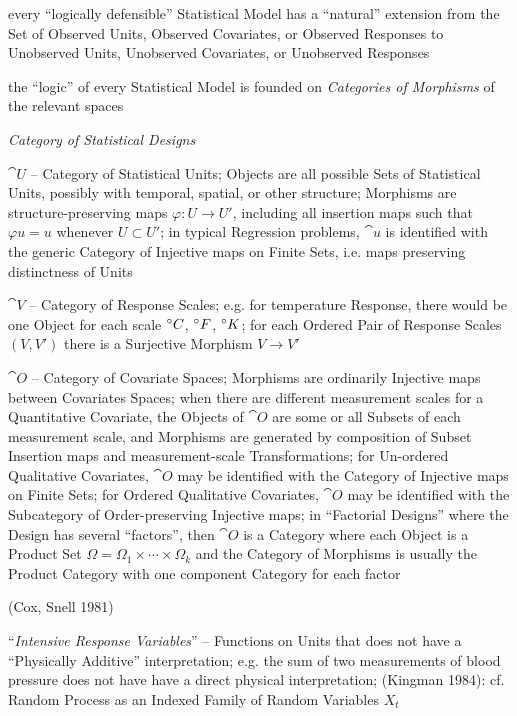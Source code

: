 every ``logically defensible'' Statistical Model has a ``natural'' extension
from the Set of Observed Units, Observed Covariates, or Observed Responses to
Unobserved Units, Unobserved Covariates, or Unobserved Responses

the ``logic'' of every Statistical Model is founded on \emph{Categories of
  Morphisms} of the relevant spaces

\emph{Category of Statistical Designs}

$\cat{U}$ -- Category of Statistical Units; Objects are all possible Sets of
Statistical Units, possibly with temporal, spatial, or other structure;
Morphisms are structure-preserving maps $\varphi : U \to U'$, including all
insertion maps such that $\varphi u = u$ whenever $U \subset U'$; in typical
Regression problems, $\cat{u}$ is identified with the generic Category of
Injective maps on Finite Sets, i.e. maps preserving distinctness of Units

$\cat{V}$ -- Category of Response Scales; e.g. for temperature Response, there
would be one Object for each scale $^{\circ} C$, $^{\circ} F$, $^{\circ} K$; for
each Ordered Pair of Response Scales $(V, V')$ there is a Surjective Morphism
$V \to V'$

$\cat{O}$ -- Category of Covariate Spaces; Morphisms are ordinarily
Injective maps between Covariates Spaces; when there are different measurement
scales for a Quantitative Covariate, the Objects of $\cat{O}$ are some or
all Subsets of each measurement scale, and Morphisms are generated by
composition of Subset Insertion maps and measurement-scale Transformations; for
Un-ordered Qualitative Covariates, $\cat{O}$ may be identified with the
Category of Injective maps on Finite Sets; for Ordered Qualitative Covariates,
$\cat{O}$ may be identified with the Subcategory of Order-preserving
Injective maps; in ``Factorial Designs'' where the Design has several
``factors'', then $\cat{O}$ is a Category where each Object is a Product
Set $\Omega = \Omega_1 \times \cdots \times \Omega_k$ and the Category of
Morphisms is usually the Product Category with one component Category for each
factor

(Cox, Snell 1981)

``\emph{Intensive Response Variables}'' -- Functions on Units that does not have
a ``Physically Additive'' interpretation; e.g. the sum of two measurements of
blood pressure does not have have a direct physical interpretation;
(Kingman 1984): cf. Random Process as an Indexed Family of Random Variables
$X_t$

